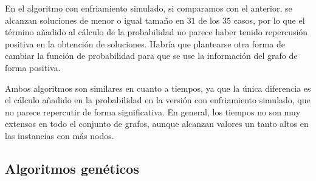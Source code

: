 En el algoritmo con enfriamiento simulado, si comparamos con el anterior, se
alcanzan soluciones de menor o igual tamaño en $31$ de los $35$ casos, por lo que
el término añadido al cálculo de la probabilidad no parece haber tenido repercusión
positiva en la obtención de soluciones. Habría que plantearse otra forma de cambiar
la función de probabilidad para que se use la información del grafo de forma positiva.

Ambos algoritmos son similares en cuanto a tiempos, ya que la única diferencia es
el cálculo añadido en la probabilidad en la versión con enfriamiento simulado,
que no parece repercutir de forma significativa. En general, los tiempos no son
muy extensos en todo el conjunto de grafos, aunque alcanzan valores un tanto altos
en las instancias con más nodos.

\subsection{Algoritmos genéticos}

